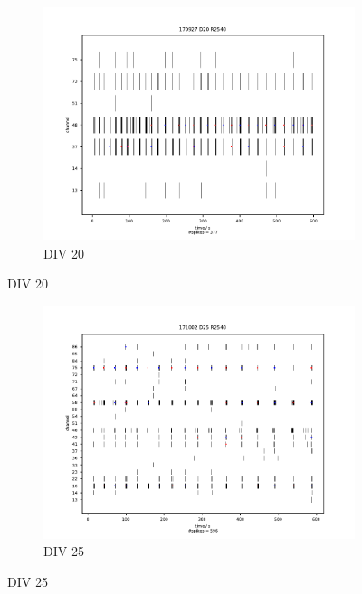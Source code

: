 \documentclass[10pt]{article}
\begin{document}
\begin{figure}[h!]
\ContinuedFloat
\begin{subfigure}{\textwidth}
	\centering
	\includegraphics[width=\textwidth]{../plots/supplementary_figures/burst_plot_2.pdf}
	\caption{DIV 20}
\end{subfigure}
\end{figure}

\begin{figure}[h!]
\ContinuedFloat
\begin{subfigure}{\textwidth}
	\centering
	\includegraphics[width=\textwidth]{../plots/supplementary_figures/burst_plot_3.pdf}
	\caption{DIV 25}
\end{subfigure}
\end{figure}
\end{document}
